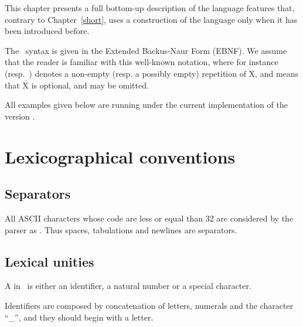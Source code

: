 


This chapter presents a full bottom-up description of the language
features that, contrary to Chapter~\ref{short}, uses a construction of
the language only when it has been introduced before.

The \elan\ syntax is given in the Extended Backus-Naur Form (EBNF). 
We assume that the reader is familiar with this well-known notation,
where for instance  \mbox{(resp. )} denotes a non-empty
(resp. a possibly empty) repetition of X, and  means that X is
optional, and may be omitted.

All examples given below are running under the current
implementation of the \elan{} version \versionElan{}.

\section{Lexicographical conventions}

\subsection{Separators}

All ASCII characters whose code are less or equal than 32 are
considered by the parser as . Thus spaces, tabulations and
newlines are separators.

\subsection{Lexical unities}

A  in \elan\ is either an identifier, a natural number
or a special character.

Identifiers are composed by concatenation of letters, numerals and the
character ``\sym\_'', and they  should begin with a letter.


